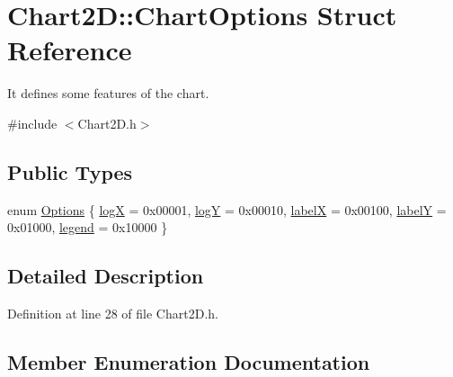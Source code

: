 \hypertarget{struct_chart2_d_1_1_chart_options}{}\section{Chart2D\+:\+:Chart\+Options Struct Reference}
\label{struct_chart2_d_1_1_chart_options}


It defines some features of the chart.  




{\ttfamily \#include $<$Chart2\+D.\+h$>$}

\subsection*{Public Types}
\begin{DoxyCompactItemize}
\item 
enum \hyperlink{struct_chart2_d_1_1_chart_options_a796006d22e811fc736d9cf4fb38f6b69}{Options} \{ \newline
\hyperlink{struct_chart2_d_1_1_chart_options_a796006d22e811fc736d9cf4fb38f6b69ac51488678d517feb63825d59ab9acfb1}{logX} = 0x00001, 
\hyperlink{struct_chart2_d_1_1_chart_options_a796006d22e811fc736d9cf4fb38f6b69af9bd258ed39b48502e9bbd0df9c6316c}{logY} = 0x00010, 
\hyperlink{struct_chart2_d_1_1_chart_options_a796006d22e811fc736d9cf4fb38f6b69a20ef332f00d99607527d9ca2a24a7ce9}{labelX} = 0x00100, 
\hyperlink{struct_chart2_d_1_1_chart_options_a796006d22e811fc736d9cf4fb38f6b69a003f8c6d93caf26f4d3160cfdf9e7f76}{labelY} = 0x01000, 
\newline
\hyperlink{struct_chart2_d_1_1_chart_options_a796006d22e811fc736d9cf4fb38f6b69abe6091aa82c65558fdb1cadaa45aec39}{legend} = 0x10000
 \}
\end{DoxyCompactItemize}


\subsection{Detailed Description}


Definition at line 28 of file Chart2\+D.\+h.



\subsection{Member Enumeration Documentation}
\mbox{\label{struct_chart2_d_1_1_chart_options_a796006d22e811fc736d9cf4fb38f6b69}} 
